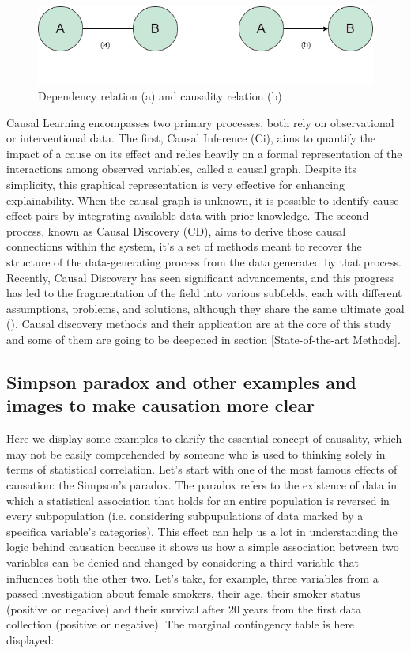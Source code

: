 \begin{figure}
    \centering
    \includegraphics[width=0.8\linewidth]{chapters/Images/Causality_vs_dependency.png}
    \caption{Dependency relation (a) and causality relation (b)}
    \label{fig0}
\end{figure}

Causal Learning encompasses two primary processes, both rely on observational or interventional data. The first, Causal Inference (Ci), aims to quantify the impact of a cause on its effect and relies heavily on a formal representation of the interactions among observed variables, called a causal graph. Despite its simplicity, this graphical representation is very effective for enhancing explainability. When the causal graph is unknown, it is possible to identify cause-effect pairs by integrating available data with prior knowledge. The second process, known as Causal Discovery (CD), aims to derive those causal connections within the system, it's a set of methods meant to recover the structure of the data-generating process from the data generated by that process. Recently, Causal Discovery has seen significant advancements, and this progress has led to the fragmentation of the field into various subfields, each with different assumptions, problems, and solutions, although they share the same ultimate goal (\cite{zanga2022survey}). Causal discovery methods and their application are at the core of this study and some of them are going to be deepened in section \ref{State-of-the-art Methods}.\\

\subsection{Simpson paradox and other examples and images to make causation more clear}
Here we display some examples to clarify the essential concept of causality, which may not be easily comprehended by someone who is used to thinking solely in terms of statistical correlation.
Let's start with one of the most famous effects of causation: the Simpson's paradox.
The paradox refers to the existence of data in which a statistical association that holds for an entire population is reversed in every subpopulation (i.e. considering subpupulations of data marked by a specifica variable's categories). This effect can help us a lot in understanding the logic behind causation because it shows us how a simple association between two variables can be denied and changed by considering a third variable that influences both the other two. 
Let's take, for example, three variables from a passed investigation about female smokers, their age, their smoker status (positive or negative) and their survival after 20 years from the first data collection (positive or negative). The marginal contingency table is here displayed:

